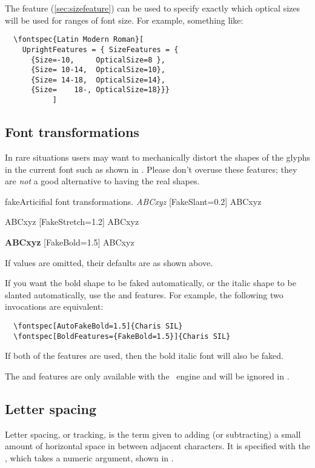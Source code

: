 The  feature (\vref*{sec:sizefeature}) can be
used to specify exactly which optical sizes will be used for ranges
of font size. For example, something like:
\begin{Verbatim}
  \fontspec{Latin Modern Roman}[
    UprightFeatures = { SizeFeatures = {
      {Size=-10,     OpticalSize=8 },
      {Size= 10-14,  OpticalSize=10},
      {Size= 14-18,  OpticalSize=14},
      {Size=    18-, OpticalSize=18}}}
           ]
\end{Verbatim}

\subsection{Font transformations}

In rare situations users may want to mechanically distort the shapes of the glyphs in the current font such as shown in . Please don't overuse these features; they are \emph{not} a good alternative to having the real shapes.

\begin{Xexample}{fake}{Articifial font transformations.}
   \emph{ABCxyz} \quad
  [FakeSlant=0.2] ABCxyz

    ABCxyz \quad
  [FakeStretch=1.2] ABCxyz

   \textbf{ABCxyz} \quad
  [FakeBold=1.5] ABCxyz
\end{Xexample}

If values are omitted, their defaults are as shown above.

If you want the bold shape to be faked automatically, or the italic shape
to be slanted automatically, use the  and
 features. For example, the following two invocations
are equivalent:
\begin{Verbatim}
  \fontspec[AutoFakeBold=1.5]{Charis SIL}
  \fontspec[BoldFeatures={FakeBold=1.5}]{Charis SIL}
\end{Verbatim}
If both of the  features are used, then the bold italic
font will also be faked.

The  and  features are only available with the \XeTeX\ engine and will be ignored in \LuaTeX.


\subsection{Letter spacing}
Letter spacing, or tracking, is the term given to adding (or subtracting) a small amount of horizontal space in between adjacent characters. It is specified with the , which takes a numeric argument,
shown in .

